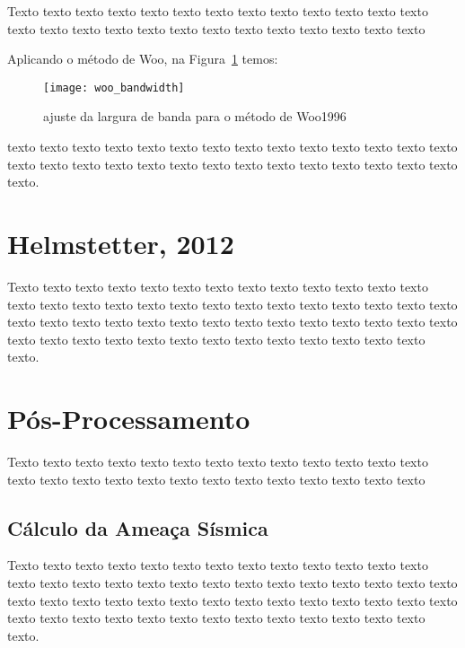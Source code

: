 Texto texto texto texto texto texto texto texto texto texto texto texto texto
texto texto texto texto texto texto texto texto texto texto texto texto texto

Aplicando o método de Woo, na Figura~\ref{fig:woo_b} temos:

\begin{figure}[!h]
  \centering
  \texttt{[image: woo\_bandwidth]} 
  \caption{ajuste da largura de banda para o método de Woo1996}
  \label{fig:woo_b} 
\end{figure}

texto texto texto texto texto texto texto texto texto texto texto texto texto
texto texto texto texto texto texto texto texto texto texto texto texto texto
texto texto texto.





\section{Helmstetter, 2012}
\label{sec:fundamentos}

Texto texto texto texto texto texto texto texto texto texto texto texto texto
texto texto texto texto texto texto texto texto texto texto texto texto texto
texto texto texto texto texto texto texto texto texto texto texto texto texto
texto texto texto texto texto texto texto texto texto texto texto texto texto
texto texto texto.


\section{Pós-Processamento}
\label{sec:fundamentos}

Texto texto texto texto texto texto texto texto texto texto texto texto texto
texto texto texto texto texto texto texto texto texto texto texto texto texto


\subsection{Cálculo da Ameaça Sísmica}
\label{sec:fundamentos}

Texto texto texto texto texto texto texto texto texto texto texto texto texto
texto texto texto texto texto texto texto texto texto texto texto texto texto
texto texto texto texto texto texto texto texto texto texto texto texto texto
texto texto texto texto texto texto texto texto texto texto texto texto texto
texto texto texto.


